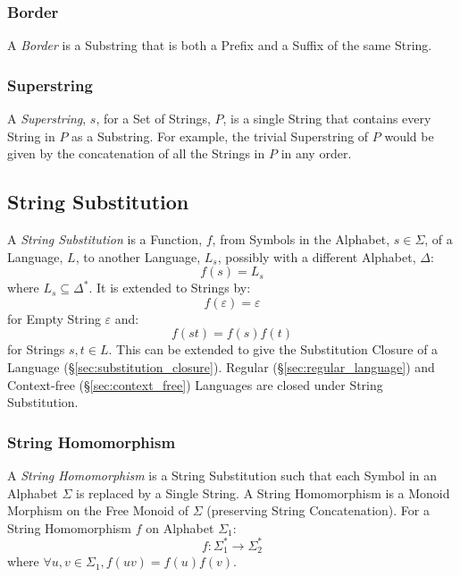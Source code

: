 \subsubsection{Border}\label{sec:string_border}

A \emph{Border} is a Substring that is both a Prefix and a Suffix of the same
String.



\subsubsection{Superstring}\label{sec:superstring}

A \emph{Superstring}, $s$, for a Set of Strings, $P$, is a single String that
contains every String in $P$ as a Substring. For example, the trivial
Superstring of $P$ would be given by the concatenation of all the Strings in $P$
in any order.



\subsection{String Substitution}\label{sec:string_substitution}

A \emph{String Substitution} is a Function, $f$, from Symbols in the Alphabet,
$s \in \Sigma$, of a Language, $L$, to another Language, $L_s$, possibly with a
different Alphabet, $\Delta$:
\[
  f(s) = L_s
\]
where $L_s \subseteq \Delta^*$. It is extended to Strings by:
\[
  f(\varepsilon) = \varepsilon
\]
for Empty String $\varepsilon$ and:
\[
  f(st) = f(s)f(t)
\]
for Strings $s,t \in L$. This can be extended to give the Substitution Closure
of a Language (\S\ref{sec:substitution_closure}). Regular
(\S\ref{sec:regular_language}) and Context-free (\S\ref{sec:context_free})
Languages are closed under String Substitution.



\subsubsection{String Homomorphism}\label{sec:string_homomorphism}

A \emph{String Homomorphism} is a String Substitution such that each Symbol in
an Alphabet $\Sigma$ is replaced by a Single String. A String Homomorphism is a
Monoid Morphism on the Free Monoid of $\Sigma$ (preserving String
Concatenation). For a String Homomorphism $f$ on Alphabet $\Sigma_1$:
\[
  f : \Sigma_1^* \rightarrow \Sigma_2^*
\]
where $\forall u,v \in \Sigma_1, f(uv) = f(u)f(v)$.

